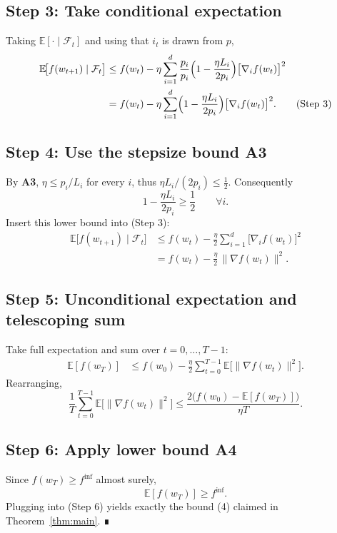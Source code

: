 \documentclass{article}
\newcommand{\EE}{\mathbb{E}}
\begin{document}
\subsection*{Step 3: Take conditional expectation}
Taking $\EE[\cdot\mid\mathcal{F}_t]$ and using that $i_t$ is drawn from $p$,
\begin{align}
\EE\!\bigl[f(w_{t+1})\mid\mathcal{F}_t\bigr]
&\le f(w_t)-\eta\sum_{i=1}^{d}
     \frac{p_i}{p_i}\Bigl(1-\frac{\eta L_i}{2p_i}\Bigr)
     \bigl[\nabla_i f(w_t)\bigr]^2 \nonumber\\
&= f(w_t)-\eta\sum_{i=1}^{d}
     \Bigl(1-\frac{\eta L_i}{2p_i}\Bigr)
     \bigl[\nabla_i f(w_t)\bigr]^2 .
\tag{Step 3}
\end{align}

\subsection*{Step 4: Use the stepsize bound \textbf{A3}}
By \textbf{A3}, $\eta\le p_i/L_i$ for every $i$, thus $\eta L_i/(2p_i)\le \tfrac12$. Consequently
\[
1-\frac{\eta L_i}{2p_i}\ge \frac12 \qquad\forall i.
\]
Insert this lower bound into (Step 3):
\begin{align}
\EE\!\bigl[f(w_{t+1})\mid\mathcal{F}_t\bigr]
&\le f(w_t)-\frac{\eta}{2}
      \sum_{i=1}^{d}\bigl[\nabla_i f(w_t)\bigr]^2 \nonumber\\
&= f(w_t)-\frac{\eta}{2}\,\|\nabla f(w_t)\|^{2}.
\tag{Step 4}
\end{align}

\subsection*{Step 5: Unconditional expectation and telescoping sum}
Take full expectation and sum over $t=0,\dots,T-1$:
\begin{align}
\EE[f(w_T)]
&\le f(w_0)-\frac{\eta}{2}\sum_{t=0}^{T-1}
      \EE\!\bigl[\|\nabla f(w_t)\|^{2}\bigr].
\tag{Step 5}
\end{align}
Rearranging,
\[
\frac{1}{T}\sum_{t=0}^{T-1}
   \EE\!\bigl[\|\nabla f(w_t)\|^{2}\bigr]
\le \frac{2\bigl(f(w_0)-\EE[f(w_T)]\bigr)}{\eta T}.
\tag{Step 6}
\]

\subsection*{Step 6: Apply lower bound \textbf{A4}}
Since $f(w_T)\ge f^{\inf}$ almost surely,
\[
\EE[f(w_T)]\ge f^{\inf}.
\]
Plugging into (Step 6) yields exactly the bound (4) claimed in Theorem~\ref{thm:main}.
∎
\end{document}
